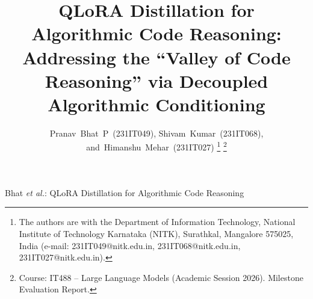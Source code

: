 \documentclass[lettersize,journal]{IEEEtran}
\begin{document}
\title{QLoRA Distillation for Algorithmic Code Reasoning:\\ Addressing the ``Valley of Code Reasoning'' via Decoupled Algorithmic Conditioning}

\author{Pranav~Bhat~P~(231IT049),
        Shivam~Kumar~(231IT068),
        and~Himanshu~Mehar~(231IT027)%
\thanks{The authors are with the Department of Information Technology, National Institute of Technology Karnataka (NITK), Surathkal, Mangalore 575025, India (e-mail: 231IT049@nitk.edu.in, 231IT068@nitk.edu.in, 231IT027@nitk.edu.in).}%
\thanks{Course: IT488 -- Large Language Models (Academic Session 2026). Milestone Evaluation Report.}%
}

%
{Bhat \MakeLowercase{\textit{et al.}}: QLoRA Distillation for Algorithmic Code Reasoning}

\maketitle
\end{document}
